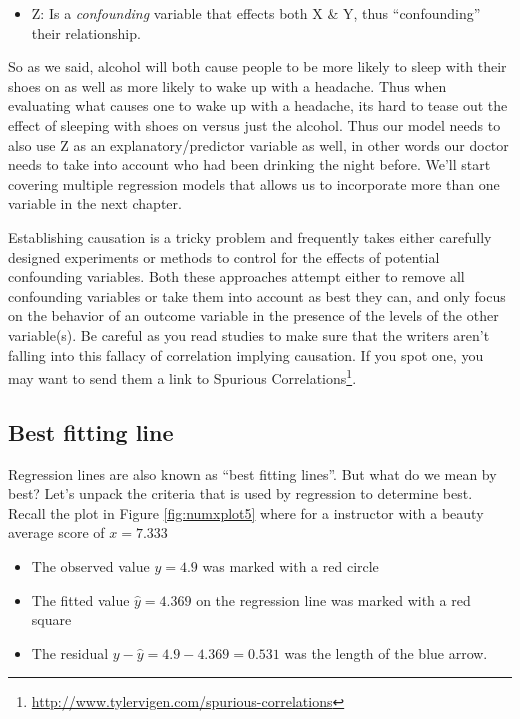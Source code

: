 \documentclass[12pt,]{krantz}
\providecommand{\tightlist}{%
  \setlength{\itemsep}{0pt}\setlength{\parskip}{0pt}}
\renewcommand{\href}[2]{#2\footnote{\url{#1}}}
\theoremstyle{definition}
\theoremstyle{definition}
\theoremstyle{definition}
\theoremstyle{remark}
\begin{document}
\begin{itemize}
\tightlist
\item
  Z: Is a \emph{confounding} variable that effects both X \& Y, thus
  ``confounding'' their relationship.
\end{itemize}

So as we said, alcohol will both cause people to be more likely to sleep
with their shoes on as well as more likely to wake up with a headache.
Thus when evaluating what causes one to wake up with a headache, its
hard to tease out the effect of sleeping with shoes on versus just the
alcohol. Thus our model needs to also use Z as an explanatory/predictor
variable as well, in other words our doctor needs to take into account
who had been drinking the night before. We'll start covering multiple
regression models that allows us to incorporate more than one variable
in the next chapter.

Establishing causation is a tricky problem and frequently takes either
carefully designed experiments or methods to control for the effects of
potential confounding variables. Both these approaches attempt either to
remove all confounding variables or take them into account as best they
can, and only focus on the behavior of an outcome variable in the
presence of the levels of the other variable(s). Be careful as you read
studies to make sure that the writers aren't falling into this fallacy
of correlation implying causation. If you spot one, you may want to send
them a link to
\href{http://www.tylervigen.com/spurious-correlations}{Spurious
Correlations}.

\subsection{Best fitting line}\label{leastsquares}

Regression lines are also known as ``best fitting lines''. But what do
we mean by best? Let's unpack the criteria that is used by regression to
determine best. Recall the plot in Figure \ref{fig:numxplot5} where for
a instructor with a beauty average score of \(x=7.333\)

\begin{itemize}
\tightlist
\item
  The observed value \(y=4.9\) was marked with a red circle
\item
  The fitted value \(\widehat{y} = 4.369\) on the regression line was
  marked with a red square
\item
  The residual \(y-\widehat{y} = 4.9-4.369 = 0.531\) was the length of
  the blue arrow.
\end{itemize}
\end{document}
